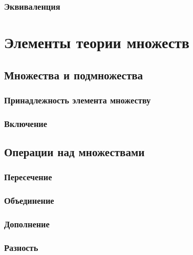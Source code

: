 \documentclass[
  letterpaper,
]{scrbook}
\theoremstyle{definition}
\theoremstyle{remark}
\begin{document}
\subsection{Эквиваленция}\label{math-logic-conditions-equivalence}


\chapter{Элементы теории множеств}\label{math-settheory}

\section{Множества и подмножества}\label{math-settheory-set}

\subsection{Принадлежность элемента
множеству}\label{math-settheory-set-in}

\subsection{Включение}\label{math-settheory-set-include}

\section{Операции над множествами}\label{math-settheory-operations}

\subsection{Пересечение}\label{math-settheory-operation-intersection}

\subsection{Объединение}\label{math-settheory-operation-union}

\subsection{Дополнение}\label{math-settheory-operation-add}

\subsection{Разность}\label{math-settheory-operation-diff}
\end{document}
